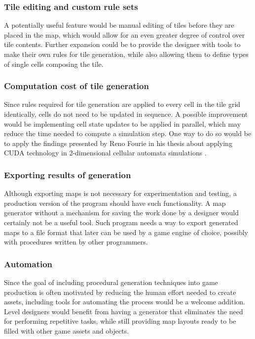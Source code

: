 \documentclass[12pt]{report}
\begin{document}
\subsubsection{Tile editing and custom rule sets}

A potentially useful feature would be manual editing of tiles before they are placed in the map, which would allow for an even greater degree of control over tile contents. Further expansion could be to provide the designer with tools to make their own rules for tile generation, while also allowing them to define types of single cells composing the tile.

\subsubsection{Computation cost of tile generation}

Since rules required for tile generation are applied to every cell in the tile grid identically, cells do not need to be updated in sequence. A possible improvement would be implementing cell state updates to be applied in parallel, which may reduce the time needed to compute a simulation step. One way to do so would be to apply the findings presented by Reno Fourie in his thesis about applying CUDA technology in 2-dimensional cellular automata simulations \autocite{fourie2015parallel}.  

\subsubsection{Exporting results of generation}

Although exporting maps is not necessary for experimentation and testing, a production version of the program should have such functionality. A map generator without a mechanism for saving the work done by a designer would certainly not be a useful tool. Such program needs a way to export generated maps to a file format that later can be used by a game engine of choice, possibly with procedures written by other programmers. 

\subsubsection{Automation}

Since the goal of including procedural generation techniques into game production is often motivated by reducing the human effort needed to create assets, including tools for automating the process would be a welcome addition. Level designers would benefit from having a generator that eliminates the need for performing repetitive tasks, while still providing map layouts ready to be filled with other game assets and objects.
\end{document}
